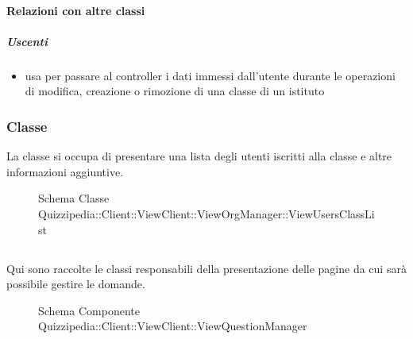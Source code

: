 \paragraph{Relazioni con altre classi}
\subparagraph{Uscenti}
\begin{itemize}
\item usa  per passare al controller i dati immessi dall'utente durante le operazioni di modifica, creazione o rimozione di una classe di un istituto
\end{itemize}
\subsubsection{Classe }
La classe si occupa di presentare una lista degli utenti iscritti alla classe e altre informazioni aggiuntive.
\begin{figure}[H]
\centering
\noindent{}
\caption[Schema Classe ViewUsersClassList]{Schema Classe Quizzipedia::Client::ViewClient::ViewOrgManager::ViewUsersClassList}
\end{figure}
\subsection{}
Qui sono raccolte le classi responsabili della presentazione delle pagine da cui sarà possibile gestire le domande.
\begin{figure}[H]
\centering
\noindent{}
\caption[Schema Componente Quizzipedia::Client::ViewClient::ViewQuestionManager]{Schema Componente Quizzipedia::Client::ViewClient::ViewQuestionManager}
\end{figure}
